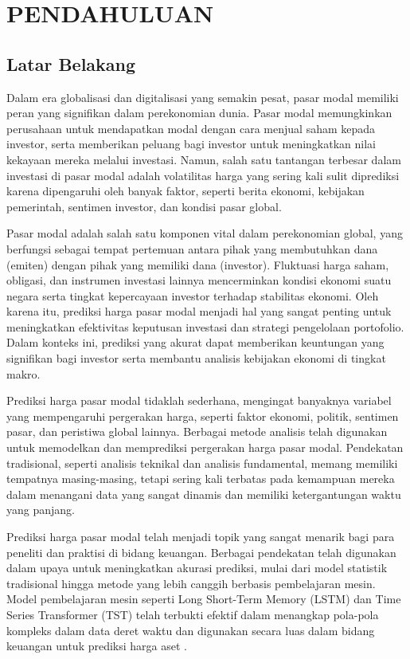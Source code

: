 \chapter{PENDAHULUAN}
\label{chap:pendahuluan}


\section{Latar Belakang}
\label{sec:latarbelakang}
Dalam era globalisasi dan digitalisasi yang semakin pesat, pasar modal memiliki peran yang signifikan dalam perekonomian dunia. Pasar modal memungkinkan perusahaan untuk mendapatkan modal dengan cara menjual saham kepada investor, serta memberikan peluang bagi investor untuk meningkatkan nilai kekayaan mereka melalui investasi. Namun, salah satu tantangan terbesar dalam investasi di pasar modal adalah volatilitas harga yang sering kali sulit diprediksi karena dipengaruhi oleh banyak faktor, seperti berita ekonomi, kebijakan pemerintah, sentimen investor, dan kondisi pasar global\autocite{singh2020stock}.

Pasar modal adalah salah satu komponen vital dalam perekonomian global, yang berfungsi sebagai tempat pertemuan antara pihak yang membutuhkan dana (emiten) dengan pihak yang memiliki dana (investor).\autocite{koller2014valuation} Fluktuasi harga saham, obligasi, dan instrumen investasi lainnya mencerminkan kondisi ekonomi suatu negara serta tingkat kepercayaan investor terhadap stabilitas ekonomi. Oleh karena itu, prediksi harga pasar modal menjadi hal yang sangat penting untuk meningkatkan efektivitas keputusan investasi dan strategi pengelolaan portofolio. Dalam konteks ini, prediksi yang akurat dapat memberikan keuntungan yang signifikan bagi investor serta membantu analisis kebijakan ekonomi di tingkat makro.

Prediksi harga pasar modal tidaklah sederhana, mengingat banyaknya variabel yang mempengaruhi pergerakan harga, seperti faktor ekonomi, politik, sentimen pasar, dan peristiwa global lainnya\autocite{lahmiri2020forecasting}. Berbagai metode analisis telah digunakan untuk memodelkan dan memprediksi pergerakan harga pasar modal. Pendekatan tradisional, seperti analisis teknikal dan analisis fundamental, memang memiliki tempatnya masing-masing, tetapi sering kali terbatas pada kemampuan mereka dalam menangani data yang sangat dinamis dan memiliki ketergantungan waktu yang panjang.

Prediksi harga pasar modal telah menjadi topik yang sangat menarik bagi para peneliti dan praktisi di bidang keuangan. Berbagai pendekatan telah digunakan dalam upaya untuk meningkatkan akurasi prediksi, mulai dari model statistik tradisional hingga metode yang lebih canggih berbasis pembelajaran mesin. Model pembelajaran mesin seperti Long Short-Term Memory (LSTM) dan Time Series Transformer (TST) telah terbukti efektif dalam menangkap pola-pola kompleks dalam data deret waktu dan digunakan secara luas dalam bidang keuangan untuk prediksi harga aset \autocite{brownlee2017deep}.

